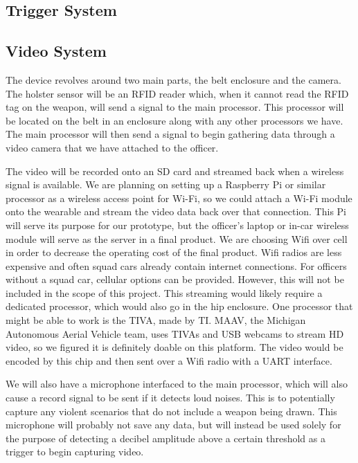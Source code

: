 \documentclass[12pt]{article}
\begin{document}
\subsection{Trigger System}

\subsection{Video System}

The device revolves around two main parts, the belt enclosure and the camera.
The holster sensor will be an RFID reader which, when it cannot read the RFID
tag on the weapon, will send a signal to the main processor. This processor
will be located on the belt in an enclosure along with any other processors we
have. The main processor will then send a signal to begin gathering data
through a video camera that we have attached to the officer. 

The video will be recorded onto an SD card and streamed back when a wireless
signal is available. We are planning on setting up a Raspberry Pi or similar
processor as a wireless access point for Wi-Fi, so we could attach a Wi-Fi
module onto the wearable and stream the video data back over that connection.
This Pi will serve its purpose for our prototype, but the officer's laptop or
in-car wireless module will serve as the server in a final product. We are
choosing Wifi over cell in order to decrease the operating cost of the final
product. Wifi radios are less expensive and often squad cars already contain
internet connections. For officers without a squad car, cellular options can be
provided. However, this will not be included in the scope of this project. This
streaming would likely require a dedicated processor, which would also go in
the hip enclosure. One processor that might be able to work is the TIVA, made
by TI. MAAV, the Michigan Autonomous Aerial Vehicle team, uses TIVAs and USB
webcams to stream HD video, so we figured it is definitely doable on this
platform. The video would be encoded by this chip and then sent over a Wifi
radio with a UART interface.

We will also have a microphone interfaced to the main processor, which will
also cause a record signal to be sent if it detects loud noises. This is to
potentially capture any violent scenarios that do not include a weapon being
drawn. This microphone will probably not save any data, but will instead be
used solely for the purpose of detecting a decibel amplitude above a certain
threshold as a trigger to begin capturing video.
\end{document}
